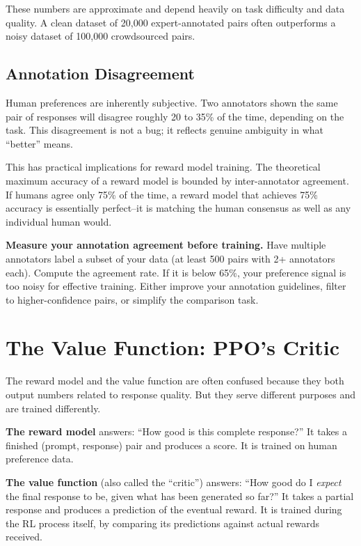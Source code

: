 \begin{chapterenv}
\begin{infobox}
These numbers are approximate and depend heavily on task difficulty and data quality. A clean dataset of 20,000 expert-annotated pairs often outperforms a noisy dataset of 100,000 crowdsourced pairs.
\end{infobox}

\subsection{Annotation Disagreement}

Human preferences are inherently subjective. Two annotators shown the same pair of responses will disagree roughly 20 to 35\% of the time, depending on the task. This disagreement is not a bug; it reflects genuine ambiguity in what ``better'' means.

This has practical implications for reward model training. The theoretical maximum accuracy of a reward model is bounded by inter-annotator agreement. If humans agree only 75\% of the time, a reward model that achieves 75\% accuracy is essentially perfect--it is matching the human consensus as well as any individual human would.

\begin{tipbox}
\textbf{Measure your annotation agreement before training.} Have multiple annotators label a subset of your data (at least 500 pairs with 2+ annotators each). Compute the agreement rate. If it is below 65\%, your preference signal is too noisy for effective training. Either improve your annotation guidelines, filter to higher-confidence pairs, or simplify the comparison task.
\end{tipbox}

\section{The Value Function: PPO's Critic}

The reward model and the value function are often confused because they both output numbers related to response quality. But they serve different purposes and are trained differently.

\textbf{The reward model} answers: ``How good is this complete response?'' It takes a finished (prompt, response) pair and produces a score. It is trained on human preference data.

\textbf{The value function} (also called the ``critic'') answers: ``How good do I \textit{expect} the final response to be, given what has been generated so far?'' It takes a partial response and produces a prediction of the eventual reward. It is trained during the RL process itself, by comparing its predictions against actual rewards received.


\end{chapterenv}
